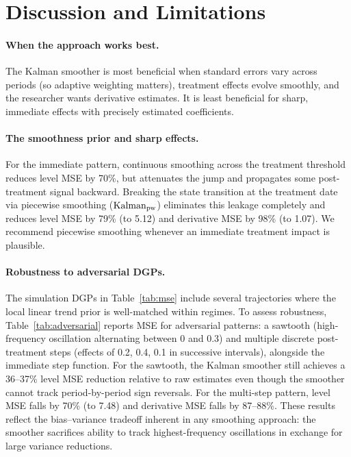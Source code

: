 \documentclass[12pt]{article}
\begin{document}
\section{Discussion and Limitations}\label{sec:limitations}

\paragraph{When the approach works best.} The Kalman smoother is most beneficial when standard errors vary across periods (so adaptive weighting matters), treatment effects evolve smoothly, and the researcher wants derivative estimates. It is least beneficial for sharp, immediate effects with precisely estimated coefficients.

\paragraph{The smoothness prior and sharp effects.} For the immediate pattern, continuous smoothing across the treatment threshold reduces level MSE by 70\%, but attenuates the jump and propagates some post-treatment signal backward. Breaking the state transition at the treatment date via piecewise smoothing ($\text{Kalman}_{\rm pw}$) eliminates this leakage completely and reduces level MSE by 79\% (to 5.12) and derivative MSE by 98\% (to 1.07). We recommend piecewise smoothing whenever an immediate treatment impact is plausible.

\paragraph{Robustness to adversarial DGPs.} The simulation DGPs in Table~\ref{tab:mse} include several trajectories where the local linear trend prior is well-matched within regimes. To assess robustness, Table~\ref{tab:adversarial} reports MSE for adversarial patterns: a sawtooth (high-frequency oscillation alternating between 0 and 0.3) and multiple discrete post-treatment steps (effects of 0.2, 0.4, 0.1 in successive intervals), alongside the immediate step function. For the sawtooth, the Kalman smoother still achieves a 36--37\% level MSE reduction relative to raw estimates even though the smoother cannot track period-by-period sign reversals. For the multi-step pattern, level MSE falls by 70\% (to 7.48) and derivative MSE falls by 87--88\%. These results reflect the bias--variance tradeoff inherent in any smoothing approach: the smoother sacrifices ability to track highest-frequency oscillations in exchange for large variance reductions.
\end{document}
